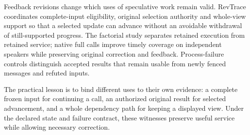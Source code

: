 Feedback revisions change which uses of speculative work remain valid.
RevTrace coordinates complete-input eligibility, original selection
authority and whole-view support so that a selected update can advance
without an avoidable withdrawal of still-supported progress. The
factorial study separates retained execution from retained service;
native full calls improve timely coverage on independent speakers while
preserving original correction and feedback. Process-failure controls
distinguish accepted results that remain usable from newly fenced
messages and refuted inputs.

The practical lesson is to bind different uses to their own evidence:
a complete frozen input for continuing a call, an authorized original
result for selected advancement, and a whole dependency path for keeping
a displayed view. Under the declared state and failure contract, these
witnesses preserve useful service while allowing necessary correction.
